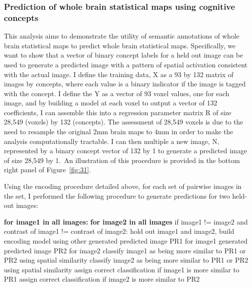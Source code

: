 \documentclass{report}
\begin{document}
\subsubsection{Prediction of whole brain statistical maps using cognitive concepts}
This analysis aims to demonstrate the utility of semantic annotations of whole brain statistical maps to predict whole brain statistical maps. Specifically, we want to show that a vector of binary concept labels for a held out image can be used to generate a predicted image with a pattern of spatial activation consistent with the actual image. I define the training data, X as a 93 by 132 matrix of images by
concepts, where each value is a binary indicator if the image is tagged
with the concept. I define the Y as a vector of 93 voxel values, one for
each image, and by building a model at each voxel to output a vector of
132 coefficients, I can assemble this into a regression parameter matrix
R of size 28,549 (voxels) by 132 (concepts). The assessment of 28,549
voxels is due to the need to resample the original 2mm brain maps to 4mm
in order to make the analysis computationally tractable. I can then
multiple a new image, N, represented by a binary concept vector of 132
by 1 to generate a predicted image of size 28,549 by 1.~An illustration
of this procedure is provided in the bottom right panel of Figure~\ref{fig:31}.

Using the encoding procedure detailed above, for each set of pairwise
images in the set, I performed the following procedure to generate
predictions for two held-out images: \newline

\textbf{for image1 in all images:} \newline
\indent \indent \textbf{for image2 in all images} \newline
\indent \indent \indent if image1 != image2 and contrast of image1 != contrast of
image2:\newline
\indent \indent \indent \indent hold out image1 and image2, build encoding model using other \newline
\indent \indent \indent \indent generated predicted image PR1 for image1   \newline  
\indent \indent \indent \indent generated predicted image PR2 for image2   \newline  
\indent \indent \indent \indent classify image1 as being more similar to PR1 or PR2 using
spatial similarity \newline
\indent \indent \indent \indent classify image2 as being more similar to PR1 or PR2 using spatial similarity \newline
\indent \indent \indent \indent assign correct classification if image1 is more similar to
PR1 \newline
\indent \indent \indent \indent assign correct classification if image2 is more similar to
PR2 \newline
\end{document}
